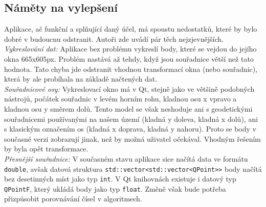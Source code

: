 \documentclass{article}
\begin{document}
	\subsection{Náměty na vylepšení} %
	\indent Aplikace, ač funkční a splňující daný účel, má spoustu nedostatků, které by bylo dobré v budoucnu odstranit. Autoři zde uvádí pár těch nejzjevnějších. \\
	\indent \textit{Vykreslování dat:} Aplikace bez problému vykreslí body, které se vejdou do jejího okna 665x605px. Problém nastává až tehdy, když jsou souřadnice větší než tato hodnota. Tato chyba jde odstranit vhodnou transformací okna (nebo souřadnic), která by ale probíhala na základě načtených dat. \\
	\indent \textit{Souřadnicové osy: } Vykreslovací okno má v Qt, stejně jako ve většině podobných nástrojů, počátek souřadnic v levém horním rohu, kladnou osu x vpravo a kladnou osu y směrem dolů. Tento model se však neshoduje ani s geodetickými souřadnicemi používanými na našem území (kladná y doleva, kladná x dolů), ani s klasickým označením os (kladná x doprava, kladná y nahoru). Proto se body v současné verzi zobrazují jinak, než by možná uživatel očekával. Vhodným řešením by byla opět transformace. \\
	\indent \textit{Přesnější souřadnice:} V současném stavu aplikace sice načítá data ve formátu \texttt{double}, avšak datová struktura \texttt{std::vector<std::vector<QPoint>>} body načítá bez desetinných míst jako typ \texttt{int}. V Qt knihovnách existuje i datový typ \texttt{QPointF}, který ukládá body jako typ \texttt{float}. Změně však bude potřeba přizpůsobit porovnávání čísel v algoritmech.


\pagestyle{empty}

\clearpage

\end{document}
